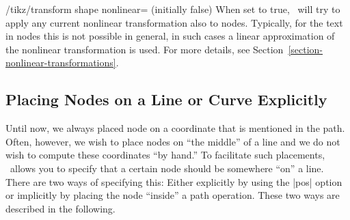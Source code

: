 \begin{key}{/tikz/transform shape nonlinear=  (initially false)}
  When set to true, \tikzname\ will try to apply any current nonlinear
  transformation also to nodes. Typically, for the text in nodes this
  is not possible in general, in such cases a linear approximation of
  the nonlinear transformation is used. For more details, see
  Section~\ref{section-nonlinear-transformations}.
\makeatletter  
\begin{codeexample}[]
\end{codeexample}
\end{key}



\subsection{Placing Nodes on a Line or Curve Explicitly}

\label{section-nodes-placing-1}

Until now, we always placed node on a coordinate that is mentioned in
the path. Often, however, we wish to place nodes on ``the middle'' of
a line and we do not wish to compute these coordinates ``by hand.''
To facilitate such placements, \tikzname\ allows you to specify that a
certain node should be somewhere ``on'' a line. There are two ways of
specifying this: Either explicitly by using the |pos| option or
implicitly by placing the node ``inside'' a path operation. These two
ways are described in the following.

\label{section-pos-option}

